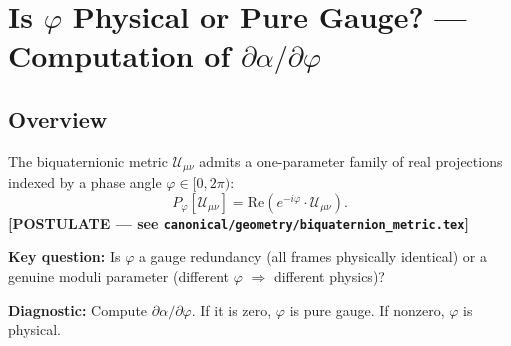 %
%



\section{Is $\varphi$ Physical or Pure Gauge? — Computation of $\partial\alpha/\partial\varphi$}
\label{sec:phi_gauge_vs_physical}

\subsection{Overview}

The biquaternionic metric $\mathcal{U}_{\mu\nu}$ admits a one-parameter family of real
projections indexed by a phase angle $\varphi \in [0, 2\pi)$:
\begin{equation}
  P_\varphi[\mathcal{U}_{\mu\nu}] = \mathrm{Re}(e^{-i\varphi} \cdot \mathcal{U}_{\mu\nu}).
  \label{eq:phase_projection}
\end{equation}
\textbf{[POSTULATE — see \texttt{canonical/geometry/biquaternion\_metric.tex}]}

\noindent \textbf{Key question:} Is $\varphi$ a gauge redundancy (all frames physically identical)
or a genuine moduli parameter (different $\varphi$ $\Rightarrow$ different physics)?

\noindent \textbf{Diagnostic:} Compute $\partial\alpha/\partial\varphi$.  If it is zero,
$\varphi$ is pure gauge.  If nonzero, $\varphi$ is physical.

